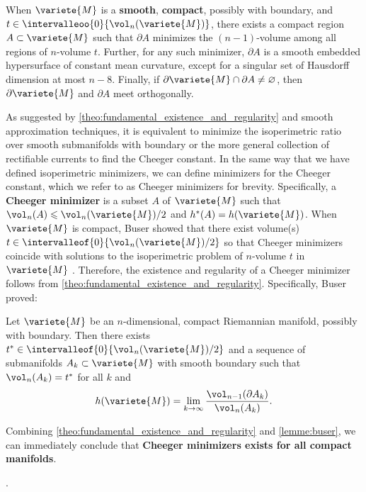 \begin{theo} \label{theo:fundamental_existence_and_regularity}
    When $\variete{M}$ is a \textbf{smooth}, \textbf{compact}, possibly with boundary, and $t \in \intervalleoo{0}{\vol_n(\variete{M})}$, there exists a compact region $A \subset \variete{M}$ such that $\partial A$ minimizes the $(n-1)$-volume among all regions of $n$-volume $t$. Further, for any such minimizer, $\partial A$ is a smooth embedded hypersurface of constant mean curvature, except for a singular set of Hausdorff dimension at most $n - 8$. Finally, if $\partial \variete{M} \cap \partial A \not= \varnothing$, then $\partial \variete{M}$ and $\partial A$ meet orthogonally.
\end{theo}

As suggested by \ref{theo:fundamental_existence_and_regularity} and smooth approximation techniques, it is equivalent to minimize the isoperimetric ratio over smooth submanifolds with boundary or the more general collection of rectifiable currents to find the Cheeger constant. In the same way that we have defined isoperimetric minimizers, we can define minimizers for the Cheeger constant, which we refer to as Cheeger minimizers for brevity. Specifically, a \textbf{Cheeger minimizer} is a subset $A$ of $\variete{M}$ such that $\vol_n(A) \leqslant \vol_n(\variete{M})/2$ and $h^\ast(A) = h(\variete{M})$. When $\variete{M}$ is compact, Buser showed that there exist volume(s) $t \in \intervalleof{0}{\vol_n(\variete{M})/2}$ so that Cheeger minimizers coincide with solutions to the isoperimetric problem of $n$-volume $t$ in $\variete{M}$ \cite[Remark 3.3, Lemma 3.4]{buser_note_1982}. Therefore, the existence and regularity of a Cheeger minimizer follows from \ref{theo:fundamental_existence_and_regularity}. Specifically, Buser proved:

\begin{lemme} \label{lemme:buser}
Let $\variete{M}$ be an $n$-dimensional, compact Riemannian manifold, possibly with boundary. Then there exists $t^\ast \in \intervalleof{0}{\vol_n(\variete{M})/2}$ and a sequence of submanifolds $A_k \subset \variete{M}$ with smooth boundary such that $\vol_n(A_k) = t^\ast$ for all $k$ and
\[
h(\variete{M}) = \lim_{k \to \infty} \frac{\vol_{n-1}(\partial A_k)}{\vol_n(A_k)}.
\]
\end{lemme}

Combining \ref{theo:fundamental_existence_and_regularity} and \ref{lemme:buser}, we can immediately conclude that \textbf{Cheeger minimizers exists for all compact manifolds}.

\begin{envide}[Interprétation]
    .
\end{envide}